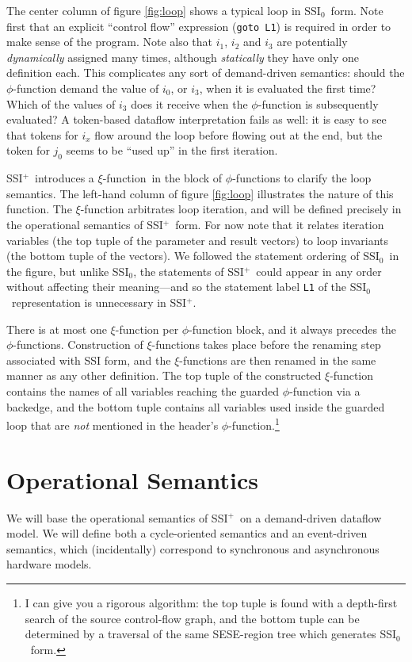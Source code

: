 \documentclass[12pt,notitlepage,twoside]{article}
\newcommand{\phifunction}{$\phi$-function}
\newcommand{\xifunction}{$\xi$-function}
\newcommand{\ssizero}{SSI$_0$}
\newcommand{\ssiplus}{SSI$^+$}
\begin{document}
The center column of figure \ref{fig:loop} shows a typical loop in
\ssizero\ form.  Note first that an explicit ``control flow''
expression (\texttt{goto L1}) is required in order to make sense of
the program.  Note also that $i_1$, $i_2$ and $i_3$ are potentially
\textit{dynamically} assigned many times, although \textit{statically}
they have only one definition each.  This complicates any sort of
demand-driven semantics: should the \phifunction{} demand the value of
$i_0$, or $i_3$, when it is evaluated the first time?  Which of the
values of $i_3$ does it receive when the \phifunction{} is
subsequently evaluated?  A token-based dataflow interpretation fails
as well: it is easy to see that tokens for $i_x$ flow around the loop
before flowing out at the end, but the token for $j_0$ seems to be
``used up'' in the first iteration.

\ssiplus\ introduces a \xifunction\ in the block of \phifunction{s} to
clarify the loop semantics. The left-hand column of figure
\ref{fig:loop} illustrates the nature of this function.  The
\xifunction{} arbitrates loop iteration, and will be defined precisely
in the operational semantics of \ssiplus\ form.  For now note that it
relates iteration variables (the top tuple of the parameter and result
vectors) to loop invariants (the bottom tuple of the vectors).  We
followed the statement ordering of \ssizero\ in the figure, but unlike
\ssizero, the statements of \ssiplus\ could appear in any order
without affecting their meaning---and so the statement label
\texttt{L1} of the \ssizero\ representation is unnecessary in \ssiplus.

There is at most one \xifunction{} per \phifunction{} block, and it
always precedes the \phifunction{s}.  Construction of \xifunction{s}
takes place before the renaming step associated with SSI form, and the
\xifunction{s} are then renamed in the same manner as any other
definition.  The top tuple of the constructed \xifunction{} contains
the names of all variables reaching the guarded \phifunction{} via a
backedge, and the bottom tuple contains all variables used inside the
guarded loop that are {\em not} mentioned in the header's
\phifunction{}.\footnote{I can give you a rigorous algorithm: the top
tuple is found with a depth-first search of the source
control-flow graph, and the bottom tuple can be determined by a
traversal of the same SESE-region tree which generates \ssizero\
form.}

\section{Operational Semantics}
We will base the operational semantics of \ssiplus\ on a demand-driven
dataflow model.  We will define both a cycle-oriented semantics and an
event-driven semantics, which (incidentally) correspond to synchronous
and asynchronous hardware models.
\end{document}
